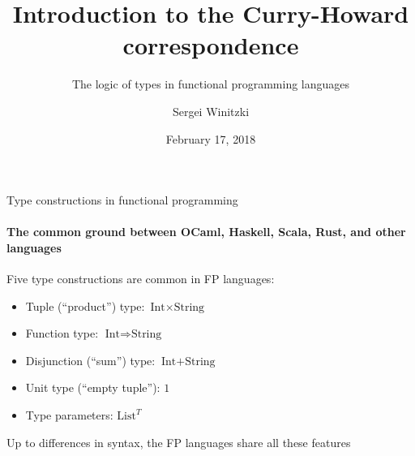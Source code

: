 \documentclass[english]{beamer}
\title[Introduction to Curry-Howard]{Introduction to the Curry-Howard
correspondence}
\subtitle{The logic of types in functional programming languages}
\author{Sergei Winitzki}
\date{February 17, 2018}
\institute[ABTB]{Academy by the Bay}
\begin{document}
\frame{\titlepage}
\begin{frame}{Type constructions in functional programming}


\framesubtitle{The common ground between OCaml, Haskell, Scala, Rust, and other
languages}

Five type constructions are common in FP languages:
\begin{itemize}
\item Tuple (``product'') type: $\text{Int}\times\text{String}$
\item Function type: $\text{Int}\Rightarrow\text{String}$
\item Disjunction (``sum'') type: $\text{Int}+\text{String}$
\item Unit type (``empty tuple''): $1$
\item Type parameters: $\text{List}^{T}$
\end{itemize}
Up to differences in syntax, the FP languages share all these features
\end{frame}
\end{document}
